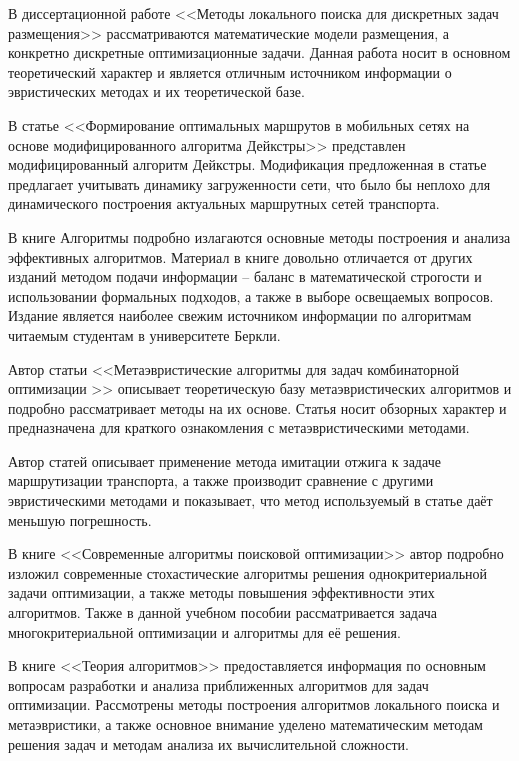 В диссертационной работе <<Методы локального поиска для дискретных задач размещения>>\cite{bib:45} 
рассматриваются математические модели размещения, а конкретно дискретные оптимизационные задачи. Данная 
работа носит в основном теоретический характер и является отличным источником информации о эвристических 
методах и их теоретической базе.

В статье <<Формирование оптимальных маршрутов в мобильных сетях на основе модифицированного алгоритма 
Дейкстры>>\cite{bib:55} представлен модифицированный алгоритм Дейкстры. Модификация предложенная в статье 
предлагает учитывать динамику загруженности сети, что было бы неплохо для динамического построения 
актуальных маршрутных сетей транспорта.

В книге Алгоритмы\cite{bib:47} подробно излагаются основные методы построения и анализа эффективных 
алгоритмов. Материал в книге довольно отличается от других изданий методом подачи информации -- баланс в 
математической строгости и использовании формальных подходов, а также в выборе освещаемых вопросов. 
Издание является наиболее свежим источником информации по алгоритмам читаемым студентам в университете Беркли.

Автор статьи <<Метаэвристические алгоритмы для задач комбинаторной оптимизации >>\cite{bib:48} описывает 
теоретическую базу метаэвристических алгоритмов и подробно рассматривает методы на их основе. Статья носит 
обзорных характер и предназначена для краткого ознакомления с метаэвристическими методами.

Автор статей \cite{bib:50,bib:51} описывает применение метода имитации отжига к задаче маршрутизации 
транспорта, а также производит сравнение с другими эвристическими методами и показывает, что метод 
используемый в статье даёт меньшую погрешность.

В книге <<Современные алгоритмы поисковой оптимизации>>\cite{bib:52} автор подробно изложил современные 
стохастические алгоритмы решения однокритериальной задачи оптимизации, а также методы повышения 
эффективности этих алгоритмов. Также в данной учебном пособии рассматривается задача многокритериальной 
оптимизации и алгоритмы для её решения.

В книге <<Теория алгоритмов>>\cite{bib:53} предоставляется информация по основным вопросам разработки и 
анализа приближенных алгоритмов для задач оптимизации. Рассмотрены методы построения алгоритмов 
локального поиска и метаэвристики, а также основное внимание уделено математическим методам решения задач 
и методам анализа их вычислительной сложности.

